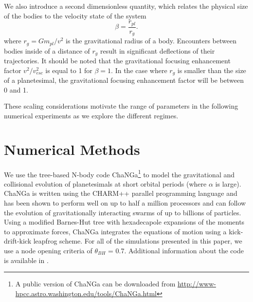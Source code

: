 \documentclass[twocolumn]{aastex63}
\begin{document}
We also introduce a second dimensionless quantity, which relates the physical size of the bodies to the velocity state of the system
\begin{equation}\label{eq:beta}
	\beta = \frac{r_{pl}}{r_{g}}.
\end{equation}
where $r_{g} = G m_{pl} / v^{2}$ is the gravitational radius of a body. Encounters between bodies inside of a distance of $r_{g}$ result in significant deflections of their trajectories. It should be noted that the gravitational focusing enhancement factor $v^{2}/v_{esc}^{2}$ is equal to 1 for $\beta = 1$. In the case where $r_{g}$ is smaller than the size of a planetesimal, the gravitational focusing enhancement factor will be between 0 and 1.

These scaling considerations motivate the range of parameters in the
following numerical experiments as we explore the different regimes.

\section{Numerical Methods}\label{sec:methods}

We use the tree-based N-body code {\sc ChaNGa}\footnote{A public version of {\sc ChaNGa} can be downloaded from \url{http://www-hpcc.astro.washington.edu/tools/ChaNGa.html}} to model the gravitational and collisional evolution of planetesimals at short orbital periods (where $\alpha$ is large). {\sc ChaNGa} is written using the {\sc CHARM++} parallel programming language and has been shown to perform well on up to half a million processors \citep{menon15} and can follow the evolution of gravitationally interacting swarms of up to billions of particles. Using a modified Barnes-Hut tree with hexadecapole expansions of the moments to approximate forces, {\sc ChaNGa} integrates the equations of motion using a kick-drift-kick leapfrog scheme. For all of the simulations presented in this paper, we use a node opening criteria of $\theta_{BH}$ = 0.7. Additional information about the code is available in \citep{jetley08,menon15}.
\end{document}
